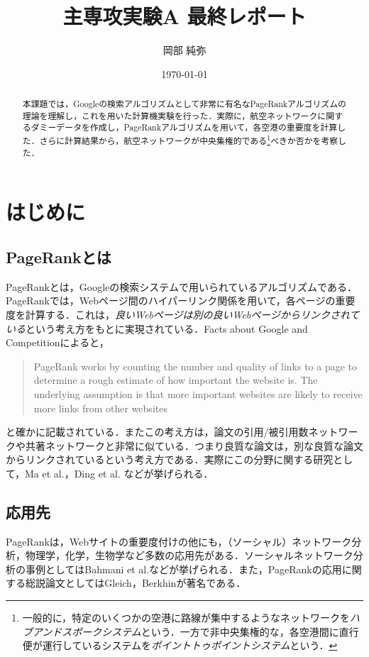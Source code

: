 \documentclass[a4j, dvipdfmx, twocolumn]{jsarticle}
\title{主専攻実験A 最終レポート}
\author{岡部 純弥}
\date{\today}
\begin{document}
\maketitle
\begin{abstract}
  本課題では，Googleの検索アルゴリズムとして非常に有名なPageRankアルゴリズム\cite{ilprints422}の理論を理解し，これを用いた計算機実験を行った．実際に，航空ネットワークに関するダミーデータを作成し，PageRankアルゴリズムを用いて，各空港の重要度を計算した．さらに計算結果から，航空ネットワークが中央集権的である\footnote{一般的に，特定のいくつかの空港に路線が集中するようなネットワークを\emph{ハブアンドスポークシステム}という．一方で非中央集権的な，各空港間に直行便が運行しているシステムを\emph{ポイントトゥポイントシステム}という．}べきか否かを考察した．
\end{abstract}

\section{はじめに}
\subsection{PageRankとは}
PageRankとは，Googleの検索システムで用いられているアルゴリズムである．PageRankでは，Webページ間のハイパーリンク関係を用いて，各ページの重要度を計算する．これは，\emph{良いWebページは別の良いWebページからリンクされている}という考え方をもとに実現されている．Facts about Google and Competitionによると，
\begin{quote}
  PageRank works by counting the number and quality of links to a page to determine a rough estimate of how important the website is. The underlying assumption is that more important websites are likely to receive more links from other websites
\end{quote}
と確かに記載されている．またこの考え方は，論文の引用/被引用数ネットワークや共著ネットワークと非常に似ている．つまり良質な論文は，別な良質な論文からリンクされているという考え方である．実際にこの分野に関する研究として，Ma et al.\cite{ma2008bringing}，Ding et al.\cite{ding2009pagerank} などが挙げられる．

\subsection{応用先}
PageRankは，Webサイトの重要度付けの他にも，（ソーシャル）ネットワーク分析，物理学，化学，生物学など多数の応用先がある．ソーシャルネットワーク分析の事例としてはBahmani et al.\cite{bahmani2010fast}などが挙げられる．また，PageRankの応用に関する総説論文としてはGleich\cite{gleich2015pagerank}，Berkhin\cite{berkhin2005survey}が著名である．
\end{document}
